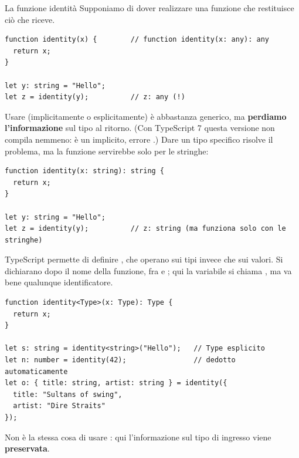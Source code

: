 \begin{esempio}{La funzione identità}
Supponiamo di dover realizzare una funzione che restituisce ciò che riceve.

\begin{lstlisting}[style=ts, name=identity_any.ts]
function identity(x) {        // function identity(x: any): any
  return x;
}

let y: string = "Hello";
let z = identity(y);          // z: any (!)
\end{lstlisting}

Usare  (implicitamente o esplicitamente) è abbastanza generico, ma
\textbf{perdiamo l'informazione} sul tipo al ritorno. (Con TypeScript 7 questa
versione non compila nemmeno:  è un  implicito, errore
.) Dare un tipo specifico risolve il problema, ma la funzione
servirebbe solo per le stringhe:

\begin{lstlisting}[style=ts, name=identity_string.ts]
function identity(x: string): string {
  return x;
}

let y: string = "Hello";
let z = identity(y);          // z: string (ma funziona solo con le stringhe)
\end{lstlisting}

TypeScript permette di definire , che operano sui tipi
invece che sui valori. Si dichiarano dopo il nome della funzione, fra \code{<}
e \code{>}; qui la variabile si chiama , ma va bene qualunque
identificatore.

\begin{affianco}[0.55][c]
\codicepiccolo
\begin{lstlisting}[style=ts, name=generics.ts]
function identity<Type>(x: Type): Type {
  return x;
}

let s: string = identity<string>("Hello");   // Type esplicito
let n: number = identity(42);                // dedotto automaticamente
let o: { title: string, artist: string } = identity({
  title: "Sultans of swing",
  artist: "Dire Straits"
});
\end{lstlisting}
\risultato
\begin{immagine}
\end{immagine}
\end{affianco}

Non è la stessa cosa di usare : qui l'informazione sul tipo di
ingresso viene \textbf{preservata}.
\end{esempio}

